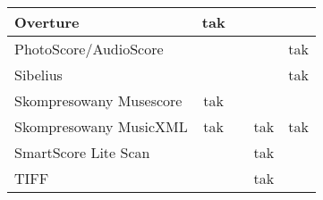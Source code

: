 \begin{center}
\begin{longtable}{|l|c|c|c|c|}
Overture                                      & tak       &          &        &          \\ \hline
PhotoScore/AudioScore                         &           &          &        & tak      \\ \hline
Sibelius                                      &           &          &        & tak      \\ \hline
Skompresowany Musescore                       & tak       &          &        &          \\ \hline
Skompresowany MusicXML                        & tak       &          & tak    & tak      \\ \hline
SmartScore Lite Scan                          &           &          & tak    &          \\ \hline
TIFF                                          &           &          & tak    &          \\ \hline
\end{longtable}
\end{center}